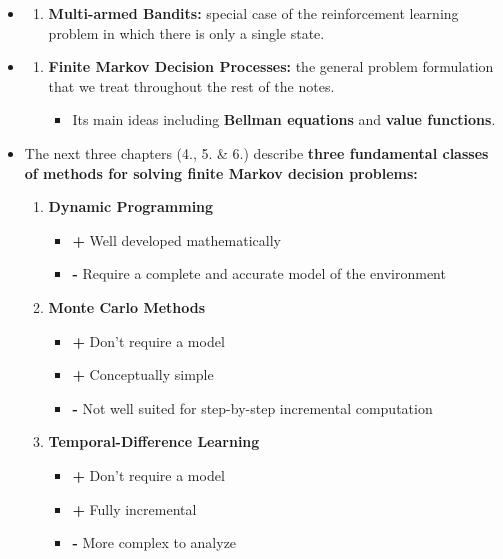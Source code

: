 \documentclass[12pt, a4paper]{article}
\begin{document}
\begin{itemize}
\item
  \begin{enumerate}
  \def\labelenumi{\arabic{enumi}.}
  \setcounter{enumi}{1}
  \item
    \textbf{Multi-armed Bandits:} special case of the reinforcement
    learning problem in which there is only a single state.
  \end{enumerate}
\item
  \begin{enumerate}
  \def\labelenumi{\arabic{enumi}.}
  \setcounter{enumi}{2}
  \item
    \textbf{Finite Markov Decision Processes:} the general problem
    formulation that we treat throughout the rest of the notes.

    \begin{itemize}
    \item
      Its main ideas including \textbf{Bellman equations} and
      \textbf{value functions}.
    \end{itemize}
  \end{enumerate}
\item
  The next three chapters (4., 5. \& 6.) describe \textbf{three
  fundamental classes of methods for solving finite Markov decision
  problems:}

  \begin{enumerate}
  \def\labelenumi{\arabic{enumi}.}
  \setcounter{enumi}{3}
  \item
    \textbf{Dynamic Programming}

    \begin{itemize}
    \item
      \textbf{+} Well developed mathematically
    \item
      \textbf{-} Require a complete and accurate model of the
      environment
    \end{itemize}
  \item
    \textbf{Monte Carlo Methods}

    \begin{itemize}
    \item
      \textbf{+} Don't require a model
    \item
      \textbf{+} Conceptually simple
    \item
      \textbf{-} Not well suited for step-by-step incremental
      computation
    \end{itemize}
  \item
    \textbf{Temporal-Difference Learning}

    \begin{itemize}
    \item
      \textbf{+} Don't require a model
    \item
      \textbf{+} Fully incremental
    \item
      \textbf{-} More complex to analyze
    \end{itemize}
  \end{enumerate}
\end{itemize}
\end{document}
